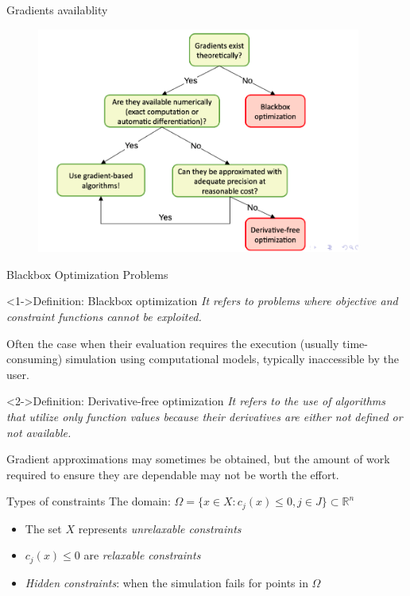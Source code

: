 \documentclass[8pt]{beamer}
\begin{document}
\begin{frame}{Gradients availablity}
  \begin{figure}[H]
    \includegraphics[width=0.95\textwidth]{Figures/GAV.png}
    \end{figure}
\end{frame}

\begin{frame}[t]{Blackbox Optimization Problems} \vspace{4pt}
\begin{block}<1->{Definition: Blackbox optimization}
{\it It refers to problems where objective and constraint functions cannot be exploited.}
\end{block}
{
Often the case when their evaluation requires the execution (usually time-consuming) simulation using computational models, typically inaccessible by the user.
}
\vfill
\begin{block}<2->{Definition: Derivative-free optimization}
{\it It refers to the use of algorithms that utilize only function values because their derivatives are either not defined or not available.}
\end{block}
{
Gradient approximations may sometimes be obtained, but the amount of work required to ensure they are dependable may not be worth the effort.
}
\end{frame}
\begin{frame}{Types of constraints}
The domain: $\Omega= \{x \in X:c_{j}(x) \leq 0, j \in J \} \subset \mathbb{R}^{n}$
\begin{itemize}
  \item The set $X$ represents {\it \color{myblue} unrelaxable constraints}
  \item $c_{j}(x)\leq0$ are {\it \color{myblue} relaxable constraints}
  \item {\it \color{myblue} Hidden constraints}: when the simulation fails for points in $\Omega$
\end{itemize}

\end{frame}
\end{document}
